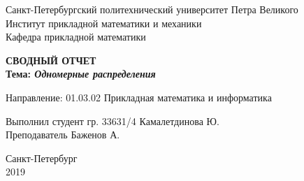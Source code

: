 \begin{titlepage}

\begin{center}
Санкт-Петербургский политехнический университет Петра Великого\\
Институт прикладной математики и механики\\
Кафедра прикладной математики\\
\end{center}


\vspace{2.5cm}

\begin{center}
{\large {\bfseries СВОДНЫЙ ОТЧЕТ}}\\

\bigskip \bfseries{Тема:} {\bfseries \emph{Одномерные распределения}}
\end{center}

\vspace{1.5cm}

\begin{flushleft}
Направление: 01.03.02 Прикладная математика и информатика

\vspace{1.5cm}

Выполнил студент гр. 33631/4 \hfill{Камалетдинова Ю.} \\ 

\vspace{0.5cm} Преподаватель \hfill{Баженов А.}
\vspace{1cm}

\end{flushleft}

\vspace{2.7cm}

\begin{center}
Санкт-Петербург\\
2019
\end{center}

\end{titlepage}

